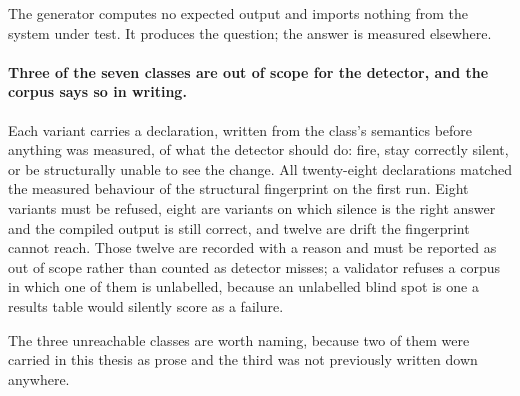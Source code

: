 The generator computes no expected output and imports nothing from the system under test. It
produces the question; the answer is measured elsewhere.

\paragraph{Three of the seven classes are out of scope for the detector, and the corpus says
so in writing.}
Each variant carries a declaration, written from the class's semantics before anything was
measured, of what the detector should do: fire, stay correctly silent, or be structurally
unable to see the change. All twenty-eight declarations matched the measured behaviour of the
structural fingerprint on the first run. Eight variants must be refused, eight are variants on
which silence is the right answer and the compiled output is still correct, and twelve are
drift the fingerprint cannot reach. Those twelve are recorded with a reason and must be
reported as out of scope rather than counted as detector misses; a validator refuses a corpus
in which one of them is unlabelled, because an unlabelled blind spot is one a results table
would silently score as a failure.

The three unreachable classes are worth naming, because two of them were carried in this thesis
as prose and the third was not previously written down anywhere.

